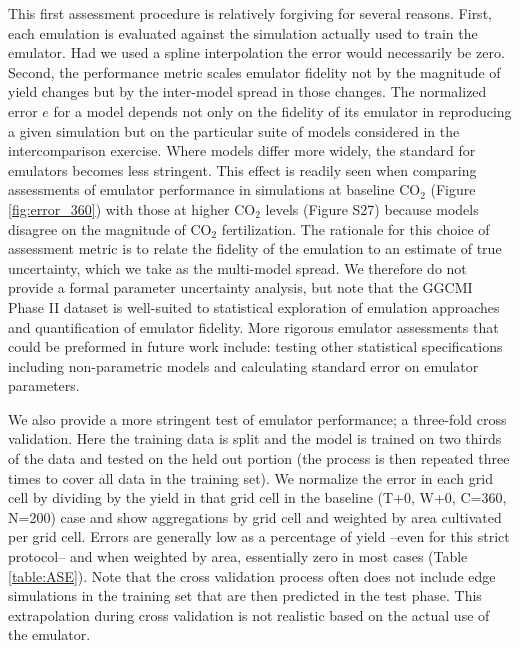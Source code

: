 \documentclass[esd, manuscript]{copernicus} %
\begin{document}
This first assessment procedure is relatively forgiving for several reasons. First, each emulation is evaluated against the simulation actually used to train the emulator. Had we used a spline interpolation the error would necessarily be zero. Second, the performance metric scales emulator fidelity not by the magnitude of yield changes but by the inter-model spread in those changes. The normalized error $e$ for a model depends not only on the fidelity of its emulator in reproducing a given simulation but on the particular suite of models considered in the intercomparison exercise. Where models differ more widely, the standard for emulators becomes less stringent. This effect is readily seen when comparing assessments of emulator performance in simulations at baseline CO$_2$ (Figure \ref{fig:error_360}) with those at higher CO$_2$ levels (Figure S27) because models disagree on the magnitude of CO$_2$ fertilization. The rationale for this choice of assessment metric is to relate the fidelity of the emulation to an estimate of true uncertainty, which we take as the multi-model spread. We therefore do not provide a formal parameter uncertainty analysis, but note that the GGCMI Phase II dataset is well-suited to statistical exploration of emulation approaches and quantification of emulator fidelity. More rigorous emulator assessments that could be preformed in future work include: testing other statistical specifications including non-parametric models and calculating standard error on emulator parameters.

We also provide a more stringent test of emulator performance; a three-fold cross validation. Here the training data is split and the model is trained on two thirds of the data and tested on the held out portion (the process is then repeated three times to cover all data in the training set). We normalize the error in each grid cell by dividing by the yield in that grid cell in the baseline (T+0, W+0, C=360, N=200) case and show aggregations by grid cell and weighted by area cultivated per grid cell. Errors are generally low as a percentage of yield --even for this strict protocol-- and when weighted by area, essentially zero in most cases (Table \ref{table:ASE}). Note that the cross validation process often does not include edge simulations in the training set that are then predicted in the test phase. This extrapolation during cross validation is not realistic based on the actual use of the emulator.
\end{document}
